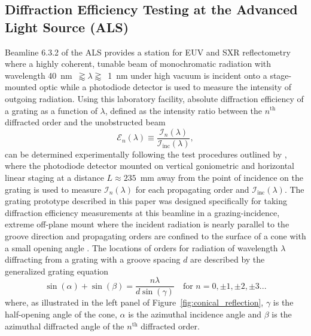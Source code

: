\documentclass{aastex63}
\begin{document}
\subsection{Diffraction Efficiency Testing at the Advanced Light Source (ALS)}\label{sec:als_testing}
Beamline 6.3.2 of the ALS provides a station for EUV and SXR reflectometry where a highly coherent, tunable beam of monochromatic radiation with wavelength 40~nm~$\gtrapprox \lambda \gtrapprox$~1~nm under high vacuum is incident onto a stage-mounted optic while a photodiode detector is used to measure the intensity of outgoing radiation. %
Using this laboratory facility, absolute diffraction efficiency of a grating as a function of $\lambda$, defined as the intensity ratio between the $n^{\text{th}}$ diffracted order and the unobstructed beam
\begin{equation}\label{eq:diffraction_efficiency}
 \mathcal{E}_n \! \left( \lambda \right)  \equiv \frac{\mathcal{I}_n \! \left( \lambda \right)}{\mathcal{I}_{\text{inc}} \! \left( \lambda \right)} ,%
 \end{equation}
can be determined experimentally following the test procedures outlined by \citet{Miles18}, where the photodiode detector mounted on vertical goniometric and horizontal linear staging at a distance $L \approx 235$~mm away from the point of incidence on the grating is used to measure $\mathcal{I}_n \! \left( \lambda \right)$ for each propagating order and $\mathcal{I}_{\text{inc}} \! \left( \lambda \right)$. %
The grating prototype described in this paper was designed specifically for taking diffraction efficiency measurements at this beamline in a grazing-incidence, extreme off-plane mount where the incident radiation is nearly parallel to the groove direction and propagating orders are confined to the surface of a cone with a small opening angle \citep{Cash91}. 
The locations of orders for radiation of wavelength $\lambda$ diffracting from a grating with a groove spacing $d$ are described by the generalized grating equation \citep{Neviere78}
\begin{equation}\label{eq:off-plane_incidence_orders}
 \sin \left( \alpha \right) + \sin \left( \beta \right) = \frac{n \lambda}{d \sin \left( \gamma \right)} \quad \text{for } n = 0, \pm 1, \pm 2, \pm 3 ... 
 \end{equation}
where, as illustrated in the left panel of Figure~\ref{fig:conical_reflection}, $\gamma$ is the half-opening angle of the cone, $\alpha$ is the azimuthal incidence angle and $\beta$ is the azimuthal diffracted angle of the $n^{\text{th}}$ diffracted order. 
\end{document}
